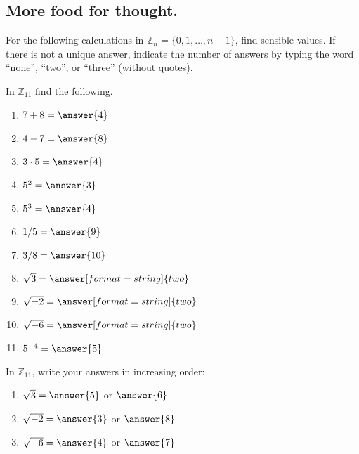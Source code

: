\documentclass[space,nooutcomes,handout]{ximera}
\begin{document}
\subsection*{More food for thought.}  For the following calculations in $\mathbb{Z}_{n} = \{0, 1, \dots, n-1\}$, find sensible values.  If there is not a unique answer, indicate the number of answers by typing the word ``none'', ``two'', or ``three'' (without quotes). 
\begin{problem}
In $\mathbb{Z}_{11}$ find the following. 
\begin{enumerate}
\item $7 + 8 =\answer{4}$
\item $4 - 7 =\answer{8}$
\item $3\cdot 5 =\answer{4}$
\item $5^2 =\answer{3}$
\item $5^3 =\answer{4}$ 
\item $1/5 =\answer{9}$
\item $3/8 =\answer{10}$ 
\item $\sqrt{3} =\answer[format=string]{two}$ %
\item $\sqrt{-2} =\answer[format=string]{two}$  %
\item $\sqrt{-6} =\answer[format=string]{two}$  %
\item  $5^{-4}  =\answer{5}$ 
\end{enumerate}
\begin{problem}
In $\mathbb{Z}_{11}$, write your answers in increasing order: 
\begin{enumerate}
\item $\sqrt{3} =\answer{5}$ or $\answer{6}$ %
\item $\sqrt{-2} =\answer{3}$ or $\answer{8}$  %
\item $\sqrt{-6} =\answer{4}$ or $\answer{7}$  %
\end{enumerate}
\end{problem}
\end{problem}
\end{document}
